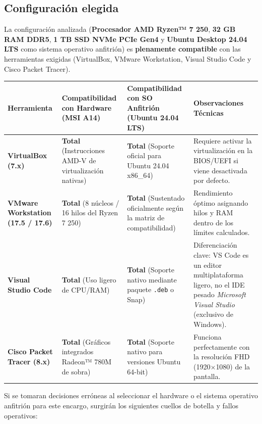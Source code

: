 \documentclass[11.5pt]{article}
\begin{document}
	\subsection{Configuración elegida}
	
	La configuración analizada (\textbf{Procesador AMD Ryzen™ 7 250}, \textbf{32 GB RAM DDR5}, \textbf{1 TB SSD NVMe PCIe Gen4} y \textbf{Ubuntu Desktop 24.04 LTS} como sistema operativo anfitrión) es \textbf{plenamente compatible} con las herramientas exigidas (VirtualBox, VMware Workstation, Visual Studio Code y Cisco Packet Tracer).
	
	\begin{table}[H]
		\centering
		\footnotesize
		\renewcommand{\arraystretch}{1.25}
		\begin{tabularx}{\textwidth}{|l|X|X|X|}
			\hline
			\textbf{Herramienta} & \textbf{Compatibilidad con Hardware (MSI A14)} & \textbf{Compatibilidad con SO Anfitrión (Ubuntu 24.04 LTS)} & \textbf{Observaciones Técnicas} \\
			\hline
			\textbf{VirtualBox (7.x)} & 
			\textbf{Total} (Instrucciones AMD-V de virtualización nativas) & 
			\textbf{Total} (Soporte oficial para Ubuntu 24.04 x86\_64) & 
			Requiere activar la virtualización en la BIOS/UEFI si viene desactivada por defecto. \\
			\hline
			\textbf{VMware Workstation (17.5 / 17.6)} & 
			\textbf{Total} (8 núcleos / 16 hilos del Ryzen 7 250) & 
			\textbf{Total} (Sustentado oficialmente según la matriz de compatibilidad) & 
			Rendimiento óptimo asignando hilos y RAM dentro de los límites calculados. \\
			\hline
			\textbf{Visual Studio Code} & 
			\textbf{Total} (Uso ligero de CPU/RAM) & 
			\textbf{Total} (Soporte nativo mediante paquete \texttt{.deb} o Snap) & 
			Diferenciación clave: VS Code es un editor multiplataforma ligero, no el IDE pesado \textit{Microsoft Visual Studio} (exclusivo de Windows). \\
			\hline
			\textbf{Cisco Packet Tracer (8.x)} & 
			\textbf{Total} (Gráficos integrados Radeon™ 780M de sobra) & 
			\textbf{Total} (Soporte nativo para versiones Ubuntu 64-bit) & 
			Funciona perfectamente con la resolución FHD (1920\(\times\)1080) de la pantalla. \\
			\hline
		\end{tabularx}
	\end{table}
	
	Si se tomaran decisiones erróneas al seleccionar el hardware o el sistema operativo anfitrión para este encargo, surgirán los siguientes cuellos de botella y fallos operativos:
	
\end{document}
